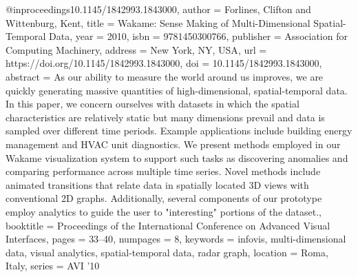 @inproceedings{10.1145/1842993.1843000,
author = {Forlines, Clifton and Wittenburg, Kent},
title = {Wakame: Sense Making of Multi-Dimensional Spatial-Temporal Data},
year = {2010},
isbn = {9781450300766},
publisher = {Association for Computing Machinery},
address = {New York, NY, USA},
url = {https://doi.org/10.1145/1842993.1843000},
doi = {10.1145/1842993.1843000},
abstract = {As our ability to measure the world around us improves, we are quickly generating massive quantities of high-dimensional, spatial-temporal data. In this paper, we concern ourselves with datasets in which the spatial characteristics are relatively static but many dimensions prevail and data is sampled over different time periods. Example applications include building energy management and HVAC unit diagnostics. We present methods employed in our Wakame visualization system to support such tasks as discovering anomalies and comparing performance across multiple time series. Novel methods include animated transitions that relate data in spatially located 3D views with conventional 2D graphs. Additionally, several components of our prototype employ analytics to guide the user to "interesting" portions of the dataset.},
booktitle = {Proceedings of the International Conference on Advanced Visual Interfaces},
pages = {33–40},
numpages = {8},
keywords = {infovis, multi-dimensional data, visual analytics, spatial-temporal data, radar graph},
location = {Roma, Italy},
series = {AVI '10}
}